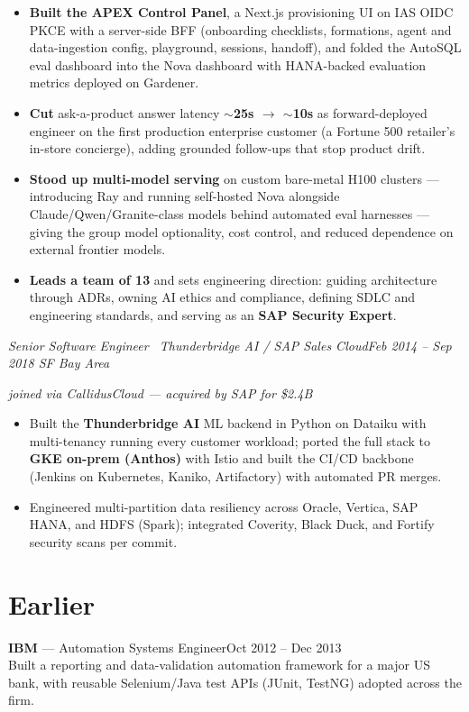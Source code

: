 \documentclass[11pt,letterpaper]{article}
\newcommand{\entrygap}{3pt}
\newcommand{\role}[2]{{\itshape #1}\hfill{\itshape #2}\par\vspace{2pt}}
\begin{document}
\begin{itemize}
  \item \textbf{Built the APEX Control Panel}, a Next.js provisioning UI on IAS OIDC PKCE with a
  server-side BFF (onboarding checklists, formations, agent and data-ingestion config, playground,
  sessions, handoff), and folded the AutoSQL eval dashboard into the Nova dashboard with HANA-backed
  evaluation metrics deployed on Gardener.
  \item \textbf{Cut} ask-a-product answer latency \textbf{$\sim$25s $\rightarrow$ $\sim$10s} as
  forward-deployed engineer on the first production enterprise customer (a Fortune 500 retailer's
  in-store concierge), adding grounded follow-ups that stop product drift.
  \item \textbf{Stood up multi-model serving} on custom bare-metal H100 clusters --- introducing Ray and
  running self-hosted Nova alongside Claude/Qwen/Granite-class models behind automated eval harnesses
  --- giving the group model optionality, cost control, and reduced dependence on external frontier
  models.
  \item \textbf{Leads a team of 13} and sets engineering direction: guiding architecture through ADRs,
  owning AI ethics and compliance, defining SDLC and engineering standards, and serving as an
  \textbf{SAP Security Expert}.
\end{itemize}
\vspace{\entrygap}

\role{Senior Software Engineer \textbar\ Thunderbridge AI / SAP Sales Cloud}{Feb 2014 -- Sep 2018 \;\textbullet\; SF Bay Area}
{\small\itshape joined via CallidusCloud --- acquired by SAP for \$2.4B}\par\vspace{2pt}
\begin{itemize}
  \item Built the \textbf{Thunderbridge AI} ML backend in Python on Dataiku with multi-tenancy running
  every customer workload; ported the full stack to \textbf{GKE on-prem (Anthos)} with Istio and built
  the CI/CD backbone (Jenkins on Kubernetes, Kaniko, Artifactory) with automated PR merges.
  \item Engineered multi-partition data resiliency across Oracle, Vertica, SAP HANA, and HDFS (Spark);
  integrated Coverity, Black Duck, and Fortify security scans per commit.
\end{itemize}

\vspace{\entrygap}
\section{Earlier}
{\scshape\bfseries IBM} \textnormal{--- Automation Systems Engineer}\hfill Oct 2012 -- Dec 2013\\[1pt]
Built a reporting and data-validation automation framework for a major US bank, with reusable
Selenium/Java test APIs (JUnit, TestNG) adopted across the firm.
\end{document}
